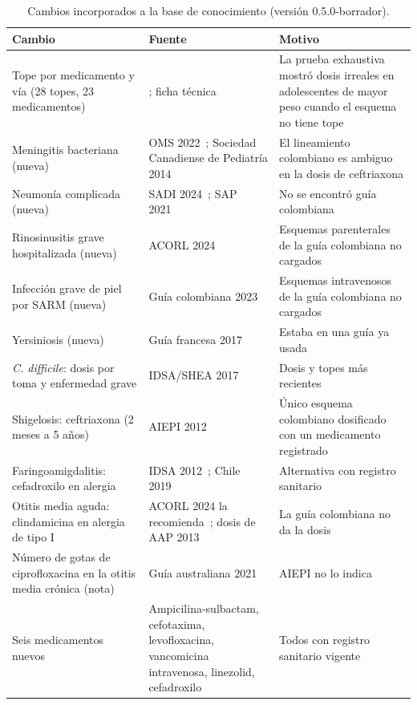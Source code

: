 \documentclass[11pt,a4paper]{article}
\begin{document}
\begin{table}[htbp]
\centering
\caption{Cambios incorporados a la base de conocimiento (versión 0.5.0-borrador).}
\label{tab:integracion}
\scriptsize
\begin{tabularx}{\textwidth}{@{}p{4.2cm}p{3.6cm}X@{}}
\toprule
Cambio & Fuente & Motivo \\
\midrule
Tope por medicamento y vía (28 topes, 23 medicamentos) & \citep{backman2025,bradley2011,lesaux2014,niceng111,buettcher2021,stevens2014,sappiel2014,mcdonald2018,cohen2017}; ficha técnica & La prueba exhaustiva mostró dosis irreales en adolescentes de mayor peso cuando el esquema no tiene tope \\
Meningitis bacteriana (nueva) & OMS 2022~\citep{aware2022}; Sociedad Canadiense de Pediatría 2014~\citep{lesaux2014} & El lineamiento colombiano es ambiguo en la dosis de ceftriaxona \\
Neumonía complicada (nueva) & SADI 2024~\citep{sadi2024}; SAP 2021~\citep{sapiras2021} & No se encontró guía colombiana \\
Rinosinusitis grave hospitalizada (nueva) & ACORL 2024~\citep{acorlrs2024} & Esquemas parenterales de la guía colombiana no cargados \\
Infección grave de piel por SARM (nueva) & Guía colombiana 2023~\citep{acin2023} & Esquemas intravenosos de la guía colombiana no cargados \\
Yersiniosis (nueva) & Guía francesa 2017~\citep{cohen2017} & Estaba en una guía ya usada \\
\emph{C. difficile}: dosis por toma y enfermedad grave & IDSA/SHEA 2017~\citep{mcdonald2018} & Dosis y topes más recientes \\
Shigelosis: ceftriaxona (2 meses a 5 años) & AIEPI 2012~\citep{aiepi2012} & Único esquema colombiano dosificado con un medicamento registrado \\
Faringoamigdalitis: cefadroxilo en alergia & IDSA 2012~\citep{shulman2012}; Chile 2019~\citep{chilefaa2019} & Alternativa con registro sanitario \\
Otitis media aguda: clindamicina en alergia de tipo I & ACORL 2024 la recomienda~\citep{acorloma2024}; dosis de AAP 2013~\citep{lieberthal2013} & La guía colombiana no da la dosis \\
Número de gotas de ciprofloxacina en la otitis media crónica (nota) & Guía australiana 2021~\citep{leach2021} & AIEPI no lo indica \\
Seis medicamentos nuevos & Ampicilina-sulbactam, cefotaxima, levofloxacina, vancomicina intravenosa, linezolid, cefadroxilo & Todos con registro sanitario vigente \\
\bottomrule
\end{tabularx}
\end{table}
\end{document}
